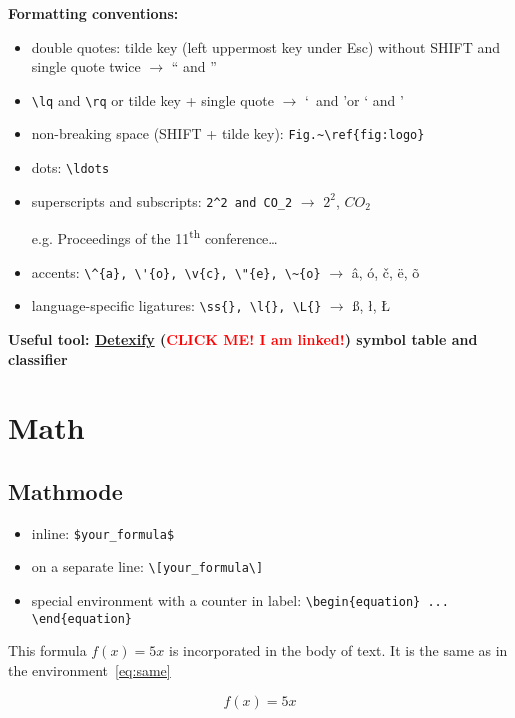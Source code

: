 \documentclass[a4paper,11pt]{article}
\begin{document}
\textbf{Formatting conventions:}

\begin{itemize}
	\item double quotes: tilde key (left uppermost key under Esc) without SHIFT and single quote twice $\rightarrow$ `` and ''
	\item \verb|\lq| and \verb|\rq| or tilde key + single quote $\rightarrow$ \lq~and \rq or ` and '
	\item non-breaking space (SHIFT + tilde key): \verb|Fig.~\ref{fig:logo}|
	\item dots: \verb|\ldots|
	\item superscripts and subscripts: \verb|2^2 and CO_2| $\rightarrow$ $2^2$, $CO_2$
	
	e.g. Proceedings of the 11\textsuperscript{th} conference\ldots
	
	\item accents: \verb|\^{a}, \'{o}, \v{c}, \"{e}, \~{o}| $\rightarrow$ \^{a}, \'{o}, \v{c}, \"{e}, \~{o}
	\item language-specific ligatures: \verb|\ss{}, \l{}, \L{}| $\rightarrow$ \ss{}, \l{}, \L{}
\end{itemize}

\textbf{Useful tool: \href{http://detexify.kirelabs.org/symbols.html}{Detexify} (\textcolor{red}{CLICK ME! I am linked!}) symbol table and classifier}

\section{Math}

\subsection{Mathmode}

\begin{itemize}
	\item inline: \verb|$your_formula$|
	\item on a separate line: \verb|\[your_formula\]|
	\item special environment with a counter in label: \verb|\begin{equation} ... \end{equation}|
\end{itemize}

This formula $f(x)=5x$ is incorporated in the body of text. It is the same as in the environment~\ref{eq:same}

\[ f(x)=5x \]
\end{document}
